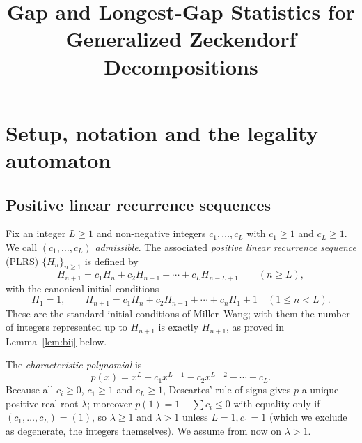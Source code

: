 \documentclass[12pt]{article}
\title{Gap and Longest-Gap Statistics for Generalized Zeckendorf Decompositions}
\author{}
\date{}
\theoremstyle{definition}
\begin{document}
\maketitle

\section{Setup, notation and the legality automaton}

\subsection{Positive linear recurrence sequences}
Fix an integer $L\ge 1$ and non-negative integers $c_1,\dots,c_L$ with
$c_1\ge 1$ and $c_L\ge 1$. We call $(c_1,\dots,c_L)$ \emph{admissible}.
The associated \emph{positive linear recurrence sequence} (PLRS)
$\{H_n\}_{n\ge1}$ is defined by
\begin{equation}\label{eq:rec}
H_{n+1}=c_1H_n+c_2H_{n-1}+\cdots+c_LH_{n-L+1}\qquad(n\ge L),
\end{equation}
with the canonical initial conditions
\begin{equation}\label{eq:init}
H_1=1,\qquad H_{n+1}=c_1H_n+c_2H_{n-1}+\cdots+c_nH_1+1\quad(1\le n<L).
\end{equation}
These are the standard initial conditions of Miller--Wang; with them the
number of integers represented up to $H_{n+1}$ is exactly $H_{n+1}$, as proved
in Lemma~\ref{lem:bij} below.

The \emph{characteristic polynomial} is
\begin{equation}\label{eq:charpoly}
p(x)=x^{L}-c_1x^{L-1}-c_2x^{L-2}-\cdots-c_L .
\end{equation}
Because all $c_i\ge0$, $c_1\ge1$ and $c_L\ge1$, Descartes' rule of signs gives
$p$ a unique positive real root $\lambda$; moreover $p(1)=1-\sum c_i\le 0$ with
equality only if $(c_1,\dots,c_L)=(1)$, so $\lambda\ge1$ and $\lambda>1$ unless
$L=1,c_1=1$ (which we exclude as degenerate, the integers themselves). We
assume from now on $\lambda>1$.
\end{document}
